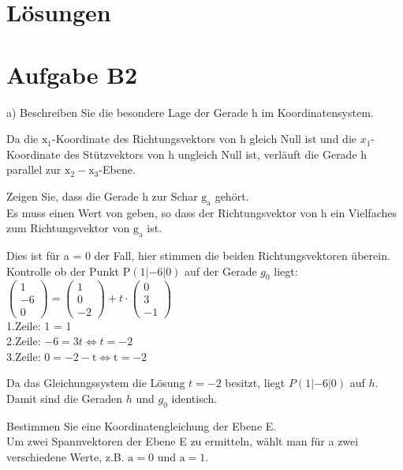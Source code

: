 \documentclass[10pt]{article}
\begin{document}
\section*{Lösungen}
\section*{Aufgabe B2}
a) Beschreiben Sie die besondere Lage der Gerade h im Koordinatensystem.

Da die $\mathrm{x}_{1}$-Koordinate des Richtungsvektors von h gleich Null ist und die $x_{1}$-Koordinate des Stützvektors von h ungleich Null ist, verläuft die Gerade h parallel zur $\mathrm{x}_{2}-\mathrm{x}_{3}$-Ebene.

Zeigen Sie, dass die Gerade h zur Schar $\mathrm{g}_{\mathrm{a}}$ gehört.\\
Es muss einen Wert von geben, so dass der Richtungsvektor von h ein Vielfaches zum Richtungsvektor von $\mathrm{g}_{\mathrm{a}}$ ist.

Dies ist für a = 0 der Fall, hier stimmen die beiden Richtungsvektoren überein.\\
Kontrolle ob der Punkt $\mathrm{P}(1|-6| 0)$ auf der Gerade $g_{0}$ liegt:\\
$\left(\begin{array}{c}1 \\ -6 \\ 0\end{array}\right)=\left(\begin{array}{c}1 \\ 0 \\ -2\end{array}\right)+t \cdot\left(\begin{array}{c}0 \\ 3 \\ -1\end{array}\right)$\\
1.Zeile: 1 = 1\\
2.Zeile: $-6=3 t \Leftrightarrow t=-2$\\
3.Zeile: $0=-2-\mathrm{t} \Leftrightarrow \mathrm{t}=-2$

Da das Gleichungssystem die Lösung $t=-2$ besitzt, liegt $P(1|-6| 0)$ auf $h$.\\
Damit sind die Geraden $h$ und $g_{0}$ identisch.

Bestimmen Sie eine Koordinatengleichung der Ebene E.\\
Um zwei Spannvektoren der Ebene E zu ermitteln, wählt man für a zwei verschiedene Werte, z.B. $\mathrm{a}=0$ und $\mathrm{a}=1$.
\end{document}
